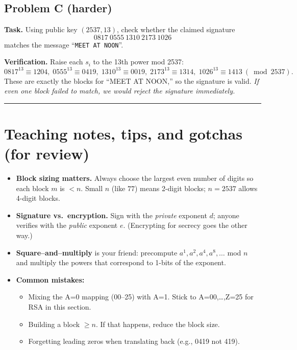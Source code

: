 \documentclass[12pt]{article}
\begin{document}
\subsection*{Problem C (harder)}
\textbf{Task.} Using public key $(2537,13)$, check whether the claimed signature
\[
\boxed{0817\ 0555\ 1310\ 2173\ 1026}
\]
matches the message “\texttt{MEET AT NOON}”.

\textbf{Verification.} Raise each $s_i$ to the 13th power mod 2537:
\[
0817^{13}\!\equiv 1204,\;
0555^{13}\!\equiv 0419,\;
1310^{13}\!\equiv 0019,\;
2173^{13}\!\equiv 1314,\;
1026^{13}\!\equiv 1413\ (\bmod 2537).
\]
These are exactly the blocks for “MEET AT NOON,” so the signature is valid.  
\emph{If even one block failed to match, we would reject the signature immediately.}

\bigskip
\hrule
\vspace{0.5em}

\section*{Teaching notes, tips, and gotchas (for review)}
\begin{itemize}
  \item \textbf{Block sizing matters.} Always choose the largest even number of digits so each block $m$ is $<n$. Small $n$ (like $77$) means 2-digit blocks; $n=2537$ allows 4-digit blocks.
  \item \textbf{Signature vs.\ encryption.} Sign with the \emph{private} exponent $d$; anyone verifies with the \emph{public} exponent $e$. (Encrypting for secrecy goes the other way.)
  \item \textbf{Square–and–multiply} is your friend: precompute $a^{1},a^{2},a^{4},a^{8},\dots$ mod $n$ and multiply the powers that correspond to 1-bits of the exponent.
  \item \textbf{Common mistakes:}
    \begin{itemize}
      \item Mixing the A=0 mapping (00–25) with A=1. Stick to A=00,\dots,Z=25 for RSA in this section.
      \item Building a block $\ge n$. If that happens, reduce the block size.
      \item Forgetting leading zeros when translating back (e.g., 0419 not 419).
    \end{itemize}
\end{itemize}
\end{document}
